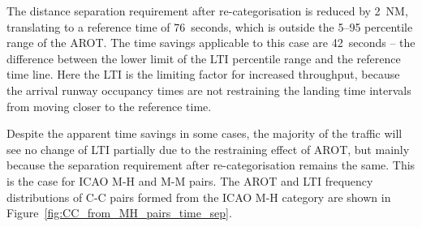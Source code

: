 The distance separation requirement after re-categorisation is reduced by 2~NM, translating to a reference time of 76~seconds, which is outside the 5--95 percentile range of the AROT. The time savings applicable to this case are 42~seconds -- the difference between the lower limit of the LTI percentile range and the reference time line. Here the LTI is the limiting factor for increased throughput, because the arrival runway occupancy times are not restraining the landing time intervals from moving closer to the reference time.

Despite the apparent time savings in some cases, the majority of the traffic will see no change of LTI partially due to the restraining effect of AROT, but mainly because the separation requirement after re-categorisation remains the same. This is the case for ICAO M-H and M-M pairs.
The AROT and LTI frequency distributions of C-C pairs formed from the ICAO M-H category are shown in Figure~\ref{fig:CC_from_MH_pairs_time_sep}. 
